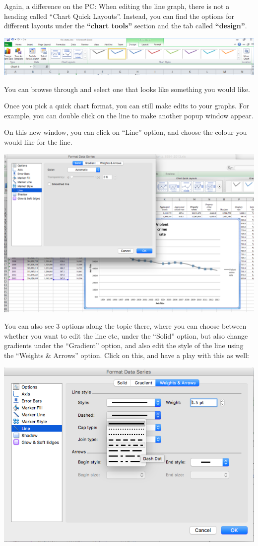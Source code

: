 \documentclass[
]{book}
\begin{document}
Again, a difference on the PC: When editing the line graph, there is not a heading called ``Chart Quick Layouts''. Instead, you can find the options for different layouts under the \textbf{``chart tools''} section and the tab called \textbf{``design''}.

\includegraphics{imgs/pc_chart_tools.png}

You can browse through and select one that looks like something you would like.

Once you pick a quick chart format, you can still make edits to your graphs. For example, you can double click on the line to make another popup window appear.

On this new window, you can click on ``Line'' option, and choose the colour you would like for the line.

\includegraphics{imgs/desc_line_edit.png}

You can also see 3 options along the topic there, where you can choose between whether you want to edit the line etc, under the ``Solid'' option, but also change gradients under the ``Gradient'' option, and also edit the style of the line using the ``Weights \& Arrows'' option. Click on this, and have a play with this as well:

\includegraphics{imgs/desc_line_type.png}
\end{document}
